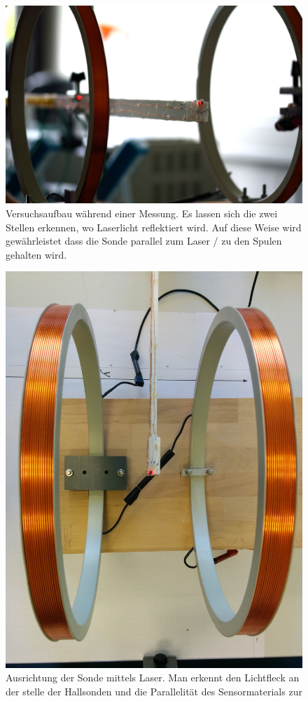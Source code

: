 \documentclass[12pt,a4paper]{article}
\begin{document}
\begin{figure}[H]
	\centering
	\includegraphics[scale=0.19]{durchfuehrung2.jpg}
	\caption{Versuchsaufbau während einer Messung. Es lassen sich die zwei Stellen erkennen, wo Laserlicht reflektiert wird. Auf diese Weise wird gewährleistet dass die Sonde parallel zum Laser / zu den Spulen gehalten wird.}
	\label{ph:1}
\end{figure}
\begin{figure}[H]
	\centering
	\includegraphics[scale=0.1]{durchfuehrung3.jpg}
	\caption{Ausrichtung der Sonde mittels Laser. Man erkennt den Lichtfleck an der stelle der Hallsonden und die Parallelität des Sensormaterials zur }
	\label{durchf3}
\end{figure}
\end{document}
